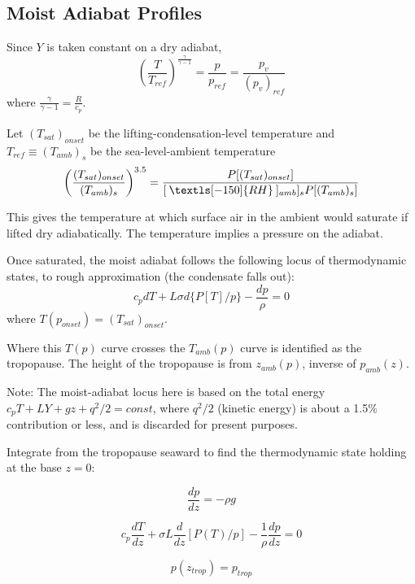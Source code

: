 \documentclass[preprint, prX]{revtex4}
\newcommand{\pfrac}[2]{\left(\frac{#1}{#2}\right)}
\newcommand{\dd}[2]{\frac{d#1}{d#2}}
\newcommand{\gogmo}{\frac{\gamma}{\gamma-1}}
\newcommand{\rh}{\:\textls[-150]{RH}\:}
\newcommand{\ztrop}{z_{trop}}
\begin{document}
\subsection{Moist Adiabat Profiles}

Since $Y$ is taken constant on a dry adiabat,   
\begin{equation}
	 \pfrac{T}{T_{ref}}^\gogmo = \frac{p}{p_{ref}} = \frac{p_v}{(p_v)_{ref}}
\end{equation}
where $\gogmo = \frac{R}{c_p}$.

Let $(T_{sat})_{onset}$ be the lifting-condensation-level temperature and $T_{ref} \equiv (T_{amb})_s$ be the sea-level-ambient temperature
\begin{equation}
	 \pfrac{ (T_{sat} )_{onset}  }{ (T_{amb})_s } ^{3.5} = \frac{ P[ (T_{sat})_{onset}]   }{[\rh]_{amb}]_s P[(T_{amb})_s]}
\end{equation}


This gives the temperature at which surface air in the ambient would saturate if lifted dry adiabatically. The temperature implies a pressure on the adiabat.

Once saturated, the moist adiabat follows the following locus of thermodynamic states, to rough approximation (the condensate falls out):
\begin{equation}
	c_p dT + L \sigma d\{ P[T]/p \} - \frac{dp}{\rho} = 0
\end{equation}
where $T(p_{onset} ) = (T_{sat} )_{onset}$.

Where this $T(p)$ curve crosses the $T_{amb}(p)$ curve is identified as the tropopause. The height of the tropopause is from $z_{amb}(p)$, inverse of $p_{amb}(z)$.

Note: The moist-adiabat locus here is based on the total energy $c_p T + L Y + gz + q^2/2 = const$, where $q^2/2$ (kinetic energy) is about a 1.5\% contribution or less, and is discarded for present purposes.

Integrate from the tropopause seaward to find the thermodynamic state holding at the base $z=0$:

\begin{equation}
	\frac{dp}{dz} = - \rho g
\end{equation}

\begin{equation}
	c_p \dd{T}{z} + \sigma L \dd{}{z} [ P(T) / p] - \frac{1}{\rho} \dd{p}{z} = 0
\end{equation}

\begin{equation}
	p(\ztrop) = p_{trop} 
\end{equation}
\end{document}
